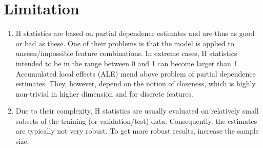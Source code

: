 \documentclass[]{article}
\begin{document}
\section{Limitation}

\begin{enumerate}
\item H statistics are based on partial dependence estimates and are thus as good or bad as these. One of their problems is that the model is applied to unseen/impossible feature combinations. In extreme cases, H statistics intended to be in the range between 0 and 1 can become larger than 1.
Accumulated local effects (ALE) \cite{apley2016} mend above problem of partial dependence estimates. They, however, depend on the notion of closeness, which is highly non-trivial in higher dimension and for discrete features.
\item Due to their complexity, H statistics are usually evaluated on relatively small subsets of the training (or validation/test) data. Consequently, the estimates are typically not very robust. To get more robust results, increase the sample size.
\end{enumerate}



\end{document}
